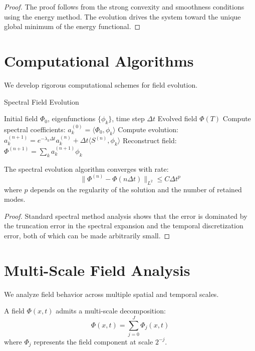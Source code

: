 \begin{proof}
The proof follows from the strong convexity and smoothness conditions using the energy method. The evolution drives the system toward the unique global minimum of the energy functional.
\end{proof}

\section{Computational Algorithms}

We develop rigorous computational schemes for field evolution.

\begin{algorithm}
\caption{Spectral Field Evolution}
\begin{algorithmic}[1]
\Require Initial field $\Phi_0$, eigenfunctions $\{\phi_k\}$, time step $\Delta t$
\Ensure Evolved field $\Phi(T)$
\State Compute spectral coefficients: $a_k^{(0)} = \langle \Phi_0, \phi_k \rangle$
        \State Compute evolution: $a_k^{(n+1)} = e^{-\lambda_k \Delta t} a_k^{(n)} + \Delta t \langle S^{(n)}, \phi_k \rangle$
    \EndFor
    \State Reconstruct field: $\Phi^{(n+1)} = \sum_k a_k^{(n+1)} \phi_k$
\EndFor
\end{algorithmic}
\end{algorithm}

\begin{theorem}
\label{thm:spectral_convergence}
The spectral evolution algorithm converges with rate:
$$\|\Phi^{(n)} - \Phi(n\Delta t)\|_{L^2} \leq C\Delta t^p$$
where $p$ depends on the regularity of the solution and the number of retained modes.
\end{theorem}

\begin{proof}
Standard spectral method analysis shows that the error is dominated by the truncation error in the spectral expansion and the temporal discretization error, both of which can be made arbitrarily small.
\end{proof}

\section{Multi-Scale Field Analysis}

We analyze field behavior across multiple spatial and temporal scales.

\begin{definition}
\label{def:multiscale_decomposition}
A field $\Phi(x,t)$ admits a multi-scale decomposition:
$$\Phi(x,t) = \sum_{j=0}^J \Phi_j(x,t)$$
where $\Phi_j$ represents the field component at scale $2^{-j}$.
\end{definition}

